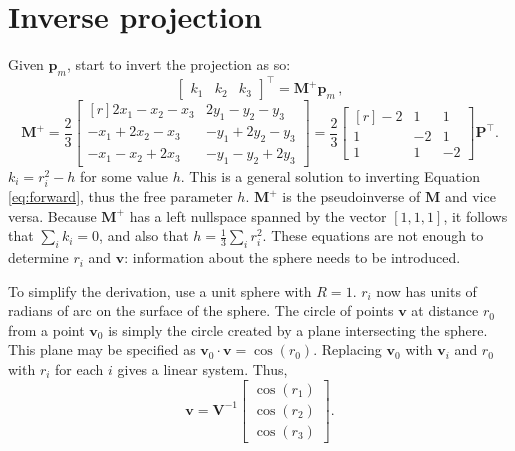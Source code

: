 \documentclass[]{interact}
\begin{document}
\section{Inverse projection}
Given $\mathbf p_m$, start to invert the projection as so:
\begin{equation}\label{eq:inverse}
\begin{bmatrix*} k_1 & k_2 & k_3

\end{bmatrix*}^\top = \mathbf M^+ \mathbf p_m \,,
\end{equation}
\begin{equation}\label{eq:inversem}
\mathbf M^+ = \frac{2}{3}
\begin{bmatrix*}[r] 2x_1 - x_2 - x_3 & 2y_1 - y_2 - y_3 \\
-x_1 + 2x_2 - x_3 & -y_1 + 2y_2 - y_3 \\
-x_1 - x_2 + 2x_3 & -y_1 - y_2 + 2y_3
\end{bmatrix*} = \frac{2}{3}
\begin{bmatrix*}[r] -2 & 1 & 1 \\
1 & -2 & 1 \\
1 & 1 & -2
\end{bmatrix*}
\mathbf P^\top .
\end{equation}
$k_i = r^2_i - h$ for some value $h$. This is a general solution to inverting
Equation \ref{eq:forward}, thus the free parameter $h$. $\mathbf M^+$ is the
pseudoinverse of $\mathbf M$ and vice versa. Because $\mathbf M^+$ has a left
nullspace spanned by the vector $[1, 1, 1]$, it follows that $\sum_i k_i = 0$,
and also that $h = \frac{1}{3}\sum_i r^2_i$.
These equations are not enough to determine $r_i$ and $\mathbf v$:
information about the sphere needs to be introduced.


To simplify the derivation, use a unit sphere with $R=1$. $r_i$ now has
units of radians of arc on the surface of the sphere. The circle of points
$\mathbf v$ at distance $r_0$ from a point $\mathbf v_0$ is simply the circle
created by a plane intersecting the sphere. This plane may be specified as
$\mathbf v_0 \cdot \mathbf v = \cos\left(r_0\right).$
Replacing $\mathbf v_0$ with $\mathbf v_i$ and $r_0$ with $r_i$
for each $i$ gives a linear system. Thus,
\begin{equation}\label{eq:inversev}
  \mathbf v = \mathbf V^{-1} \begin{bmatrix*} \cos\left(r_1\right) \\
  \cos\left(r_2\right) \\
  \cos\left(r_3\right)
  \end{bmatrix*}.
\end{equation}
\end{document}
